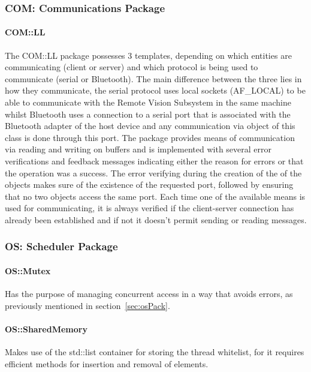 \subsubsection{COM: Communications Package}
\paragraph{COM::LL}
The COM::LL package possesses 3 templates, depending on which entities are communicating (client or server) and which protocol is being used to communicate (serial or Bluetooth). The main difference between the three lies in how they communicate, the serial protocol uses local sockets (AF\_LOCAL) to be able to communicate with the Remote Vision Subsystem in the same machine whilst Bluetooth uses a connection to a serial port that is associated with the Bluetooth adapter of the host device and any communication via object of this class is done through this port.
The package provides means of communication via reading and writing on buffers and is implemented with several error verifications and feedback messages indicating either the reason for errors or that the operation was a success. The error verifying during the creation of the of the objects makes sure of the existence of the requested port, followed by ensuring that no two objects access the same port. Each time one of the available means is used for communicating, it is always verified if the client-server connection has already been established and if not it doesn't permit sending or reading messages.
%

%
\subsubsection{OS: Scheduler Package}
\paragraph{OS::Mutex}
Has the purpose of managing concurrent access in a way that avoids errors, as previously mentioned in section~\ref{sec:osPack}.



\paragraph{OS::SharedMemory}
Makes use of the std::list container for storing the thread whitelist, for it requires efficient methods for insertion and removal of elements.


